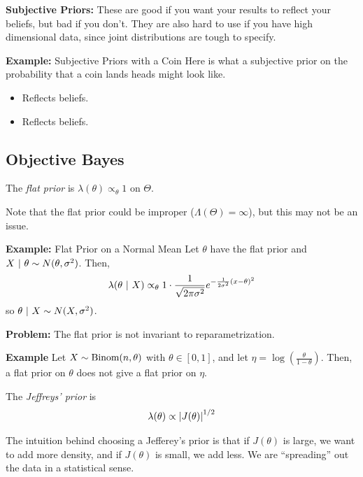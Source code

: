 
\textbf{Subjective Priors:} These are good if you want your results to reflect your beliefs, but bad if you don't. They are also hard to use if you have high dimensional data, since joint distributions are tough to specify.

\begin{example}{\textbf{Example:} Subjective Priors with a Coin}
    Here is what a subjective prior on the probability that a coin lands heads might look like.
    \begin{itemize}
        \item[\checkmark] Reflects beliefs.
        \item[$\times$] Reflects beliefs.
    \end{itemize}
\end{example}

\subsection*{Objective Bayes}
\sectionspace

\begin{definition}
    The \emph{flat prior} is $\lambda(\theta) \propto_{\theta} 1$ on $\Theta$.
\end{definition}
Note that the flat prior could be improper ($\Lambda(\Theta) = \infty$), but this may not be an issue.

\begin{example}{\textbf{Example:} Flat Prior on a Normal Mean}
    Let $\theta$ have the flat prior and $X \ |\  \theta \sim N(\theta, \sigma^2)$. Then,
    \[ \lambda(\theta \ |\  X) \propto_{\theta} 1 \cdot \frac{1}{\sqrt{2\pi\sigma^2}}e^{-\frac{1}{2\sigma^2}(x - \theta)^2} \]
    so $\theta \ |\  X \sim N(X, \sigma^{2})$.
\end{example}

\textbf{Problem:} The flat prior is not invariant to reparametrization.

\begin{example}{\textbf{Example}}
    Let $X \sim \text{Binom}(n, \theta)$ with $\theta \in [0, 1]$, and let $\eta = \log\left(\frac{\theta}{1 - \theta}\right)$. Then, a flat prior on $\theta$ does not give a flat prior on $\eta$.
\end{example}

\begin{definition}
    The \emph{Jeffreys' prior} is
    \[ \lambda(\theta) \propto \left\lvert {J(\theta)} \right\rvert^{1/2} \]
\end{definition}
The intuition behind choosing a Jefferey's prior is that if $J(\theta)$ is large, we want to add more density, and if $J(\theta)$ is small, we add less. We are ``spreading'' out the data in a statistical sense.
    

